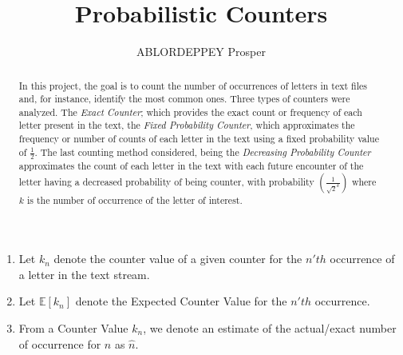\documentclass[longpaper, english, final, times]{revdetua}
\begin{document}
	
	
	\title{Probabilistic Counters}
	\author{ABLORDEPPEY Prosper} %
	\maketitle
	
	\begin{abstract}%
		In this project, the goal is to count the number of occurrences of letters in text files and, for instance, identify the most common ones. Three types of counters were analyzed. The \textit{Exact Counter}; which provides the exact count or frequency of each letter present in the text, the \textit{Fixed Probability Counter}, which approximates the frequency or number of counts of each letter in the text using a fixed probability value of $\frac{1}{2}$. The last counting method considered, being the \textit{Decreasing Probability Counter} approximates the count of each letter in the text with each future encounter of the letter having a decreased probability of being counter, with probability $\left(\frac{1}{\sqrt{2}^k}\right)$ where $k$ is the number of occurrence of the letter of interest.
	\end{abstract}
	
	
	\begin{keywords}%
		\begin{enumerate}
			\item Let $k_n$ denote the counter value of a given counter for the $n'th$ occurrence of a letter in the text stream.
			\item Let $\mathbb{E}[k_n]$ denote the Expected Counter Value for the $n'th$ occurrence.
			\item From a Counter Value $k_n$, we denote an estimate of the actual/exact number of occurrence for $n$ as $\hat{n}$.
		\end{enumerate}
	\end{keywords}
	
\end{document}

